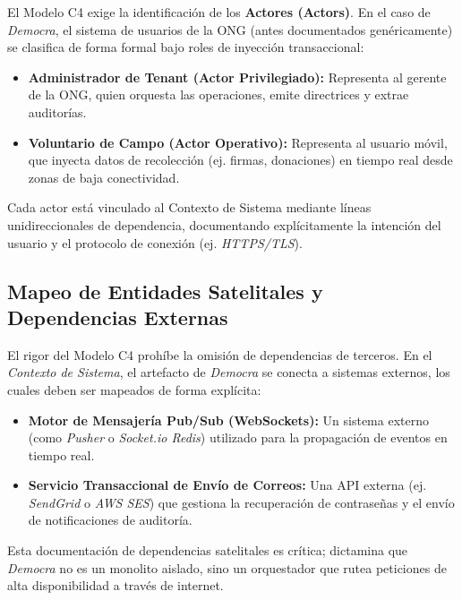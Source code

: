 El Modelo C4 exige la identificaci\'on de los \textbf{Actores (Actors)}. En el caso de \textit{Democra}, el sistema de usuarios de la ONG (antes documentados gen\'ericamente) se clasifica de forma formal bajo roles de inyecci\'on transaccional:
\begin{itemize}
    \item \textbf{Administrador de Tenant (Actor Privilegiado):} Representa al gerente de la ONG, quien orquesta las operaciones, emite directrices y extrae auditor\'ias.
    \item \textbf{Voluntario de Campo (Actor Operativo):} Representa al usuario m\'ovil, que inyecta datos de recolecci\'on (ej. firmas, donaciones) en tiempo real desde zonas de baja conectividad.
\end{itemize}

Cada actor est\'a vinculado al Contexto de Sistema mediante l\'ineas unidireccionales de dependencia, documentando expl\'icitamente la intenci\'on del usuario y el protocolo de conexi\'on (ej. \textit{HTTPS/TLS}).

\subsection{Mapeo de Entidades Satelitales y Dependencias Externas}

El rigor del Modelo C4 proh\'ibe la omisi\'on de dependencias de terceros. En el \textit{Contexto de Sistema}, el artefacto de \textit{Democra} se conecta a sistemas externos, los cuales deben ser mapeados de forma expl\'icita:
\begin{itemize}
    \item \textbf{Motor de Mensajer\'ia Pub/Sub (WebSockets):} Un sistema externo (como \textit{Pusher} o \textit{Socket.io Redis}) utilizado para la propagaci\'on de eventos en tiempo real.
    \item \textbf{Servicio Transaccional de Env\'io de Correos:} Una API externa (ej. \textit{SendGrid} o \textit{AWS SES}) que gestiona la recuperaci\'on de contrase\~nas y el env\'io de notificaciones de auditor\'ia.
\end{itemize}
Esta documentaci\'on de dependencias satelitales es cr\'itica; dictamina que \textit{Democra} no es un monolito aislado, sino un orquestador que rutea peticiones de alta disponibilidad a trav\'es de internet.
